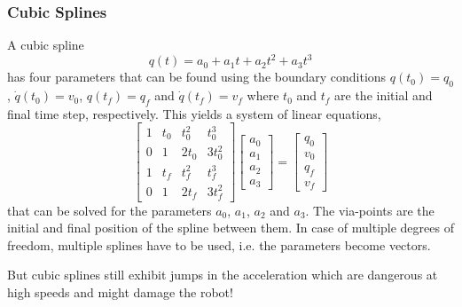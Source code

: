 			\subsubsection{Cubic Splines}
				A cubic spline
				\begin{equation*}
					q(t) = a_0 + a_1 t + a_2 t^2 + a_3 t^3
				\end{equation*}
				has four parameters that can be found using the boundary conditions \( q(t_0) = q_0 \), \( \dot{q}(t_0) = v_0 \), \( q(t_f) = q_f \) and \( \dot{q}(t_f) = v_f \) where \(t_0\) and \(t_f\) are the initial and final time step, respectively. This yields a system of linear equations,
				\begin{equation*}
					\begin{bmatrix}
						1 & t_0 & t_0^2 & t_0^3   \\
						0 & 1   & 2 t_0 & 3 t_0^2 \\
						1 & t_f & t_f^2 & t_f^3   \\
						0 & 1   & 2 t_f & 3 t_f^2
					\end{bmatrix}
					\begin{bmatrix}
						a_0 \\
						a_1 \\
						a_2 \\
						a_3
					\end{bmatrix}
					=
					\begin{bmatrix}
						q_0 \\
						v_0 \\
						q_f \\
						v_f
					\end{bmatrix}
				\end{equation*}
				that can be solved for the parameters \(a_0\), \(a_1\), \(a_2\) and \(a_3\). The via-points are the initial and final position of the spline between them. In case of multiple degrees of freedom, multiple splines have to be used, i.e. the parameters become vectors.

				But cubic splines still exhibit jumps in the acceleration which are dangerous at high speeds and might damage the robot!

